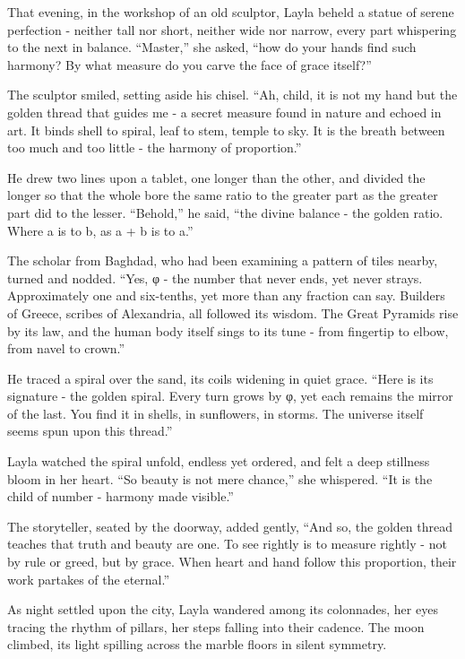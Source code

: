 \documentclass[
  letterpaper,
  DIV=11,
  numbers=noendperiod]{scrreprt}
\begin{document}
That evening, in the workshop of an old sculptor, Layla beheld a statue
of serene perfection - neither tall nor short, neither wide nor narrow,
every part whispering to the next in balance. ``Master,'' she asked,
``how do your hands find such harmony? By what measure do you carve the
face of grace itself?''

The sculptor smiled, setting aside his chisel. ``Ah, child, it is not my
hand but the golden thread that guides me - a secret measure found in
nature and echoed in art. It binds shell to spiral, leaf to stem, temple
to sky. It is the breath between too much and too little - the harmony
of proportion.''

He drew two lines upon a tablet, one longer than the other, and divided
the longer so that the whole bore the same ratio to the greater part as
the greater part did to the lesser. ``Behold,'' he said, ``the divine
balance - the golden ratio. Where a is to b, as a + b is to a.''

The scholar from Baghdad, who had been examining a pattern of tiles
nearby, turned and nodded. ``Yes, φ - the number that never ends, yet
never strays. Approximately one and six-tenths, yet more than any
fraction can say. Builders of Greece, scribes of Alexandria, all
followed its wisdom. The Great Pyramids rise by its law, and the human
body itself sings to its tune - from fingertip to elbow, from navel to
crown.''

He traced a spiral over the sand, its coils widening in quiet grace.
``Here is its signature - the golden spiral. Every turn grows by φ, yet
each remains the mirror of the last. You find it in shells, in
sunflowers, in storms. The universe itself seems spun upon this
thread.''

Layla watched the spiral unfold, endless yet ordered, and felt a deep
stillness bloom in her heart. ``So beauty is not mere chance,'' she
whispered. ``It is the child of number - harmony made visible.''

The storyteller, seated by the doorway, added gently, ``And so, the
golden thread teaches that truth and beauty are one. To see rightly is
to measure rightly - not by rule or greed, but by grace. When heart and
hand follow this proportion, their work partakes of the eternal.''

As night settled upon the city, Layla wandered among its colonnades, her
eyes tracing the rhythm of pillars, her steps falling into their
cadence. The moon climbed, its light spilling across the marble floors
in silent symmetry.
\end{document}
